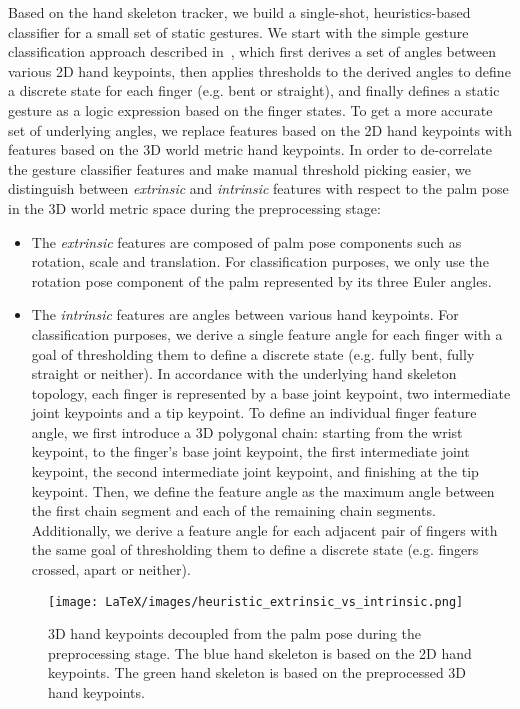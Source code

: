 \documentclass[10pt,twocolumn,letterpaper]{article}
\begin{document}
Based on the hand skeleton tracker, we build a single-shot, heuristics-based classifier for a small set of static gestures. We start with the simple gesture classification approach described in~\cite{zhang20}, which first derives a set of angles between various 2D hand keypoints, then applies thresholds to the derived angles to define a discrete state for each finger (e.g. bent or straight), and finally defines a static gesture as a logic expression based on the finger states. To get a more accurate set of underlying angles, we replace features based on the 2D hand keypoints with features based on the 3D world metric hand keypoints. In order to de-correlate the gesture classifier features and make manual threshold picking easier, we distinguish between \textit{extrinsic} and \textit{intrinsic} features with respect to the palm pose in the 3D world metric space during the preprocessing stage:

\begin{itemize}
\setlength{\parskip}{0pt}
\setlength{\itemsep}{0pt plus 1pt}
    \item The \textit{extrinsic} features are composed of palm pose components such as rotation, scale and translation. For classification purposes, we only use the rotation pose component of the palm represented by its three Euler angles.
    \item The \textit{intrinsic} features are angles between various hand keypoints. For classification purposes, we derive a single feature angle for each finger with a goal of thresholding them to define a discrete state (e.g. fully bent, fully straight or neither). In accordance with the underlying hand skeleton topology, each finger is represented by a base joint keypoint, two intermediate joint keypoints and a tip keypoint. To define an individual finger feature angle, we first introduce a 3D polygonal chain: starting from the wrist keypoint, to the finger's base joint keypoint, the first intermediate joint keypoint, the second intermediate joint keypoint, and finishing at the tip keypoint. Then, we define the feature angle as the maximum angle between the first chain segment and each of the remaining chain segments. Additionally, we derive a feature angle for each adjacent pair of fingers with the same goal of thresholding them to define a discrete state (e.g. fingers crossed, apart or neither).
\end{itemize}

\begin{figure}
\begin{center}
   \texttt{[image: LaTeX/images/heuristic\_extrinsic\_vs\_intrinsic.png]}
\end{center}
   \caption{3D hand keypoints decoupled from the palm pose during the preprocessing stage. The blue hand skeleton is based on the 2D hand keypoints. The green hand skeleton is based on the preprocessed 3D hand keypoints.}
\label{fig:heuristic_extrinsic_vs_intrinsic}
\end{figure}
\end{document}
